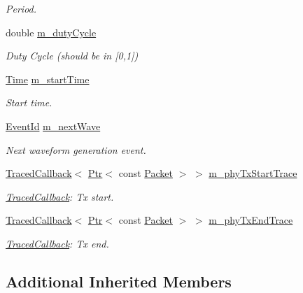 \begin{DoxyCompactItemize}
\begin{DoxyCompactList}\small\item\em Period. \end{DoxyCompactList}\item 
double \hyperlink{classns3_1_1WaveformGenerator_ae82f38f37abe89a657c3e1d789f10ce0}{m\+\_\+duty\+Cycle}
\begin{DoxyCompactList}\small\item\em Duty Cycle (should be in \mbox{[}0,1\mbox{]}) \end{DoxyCompactList}\item 
\hyperlink{classns3_1_1Time}{Time} \hyperlink{classns3_1_1WaveformGenerator_aad36cca1eea96f150758fa9bb5a23a7f}{m\+\_\+start\+Time}
\begin{DoxyCompactList}\small\item\em Start time. \end{DoxyCompactList}\item 
\hyperlink{classns3_1_1EventId}{Event\+Id} \hyperlink{classns3_1_1WaveformGenerator_a19a2480971ecc44ffc0dec3034bcfc29}{m\+\_\+next\+Wave}
\begin{DoxyCompactList}\small\item\em Next waveform generation event. \end{DoxyCompactList}\item 
\hyperlink{classns3_1_1TracedCallback}{Traced\+Callback}$<$ \hyperlink{classns3_1_1Ptr}{Ptr}$<$ const \hyperlink{classns3_1_1Packet}{Packet} $>$ $>$ \hyperlink{classns3_1_1WaveformGenerator_a2a0659bb685dc46fa9cd7c6b85cf6a42}{m\+\_\+phy\+Tx\+Start\+Trace}
\begin{DoxyCompactList}\small\item\em \hyperlink{classns3_1_1TracedCallback}{Traced\+Callback}\+: Tx start. \end{DoxyCompactList}\item 
\hyperlink{classns3_1_1TracedCallback}{Traced\+Callback}$<$ \hyperlink{classns3_1_1Ptr}{Ptr}$<$ const \hyperlink{classns3_1_1Packet}{Packet} $>$ $>$ \hyperlink{classns3_1_1WaveformGenerator_af6111fb8eea2a3e2be3a96a5f28cb129}{m\+\_\+phy\+Tx\+End\+Trace}
\begin{DoxyCompactList}\small\item\em \hyperlink{classns3_1_1TracedCallback}{Traced\+Callback}\+: Tx end. \end{DoxyCompactList}\end{DoxyCompactItemize}
\subsection*{Additional Inherited Members}


